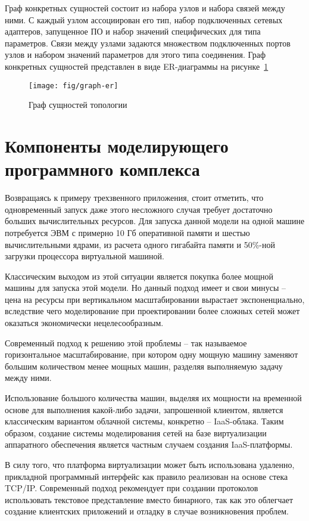 Граф конкретных сущностей состоит из 
набора узлов и набора связей между ними. 
С каждый узлом ассоциирован его тип, набор подключенных сетевых адаптеров, запущенное ПО и 
набор значений специфических для типа параметров. 
Связи между узлами задаются множеством подключенных портов узлов 
и набором значений параметров для этого типа соединения.
Граф конкретных сущностей представлен в виде ER-диаграммы на рисунке~\ref{fig:graph-er}
\begin{figure}
  \centering
  {\texttt{[image: fig/graph-er]}}
  \caption{Граф сущностей топологии}
  \label{fig:graph-er}
\end{figure} 

\section{Компоненты моделирующего программного комплекса}

Возвращаясь к примеру трехзвенного приложения, стоит отметить, что одновременный запуск
даже этого несложного случая требует достаточно больших вычислительных ресурсов.
Для запуска данной модели на одной машине потребуется ЭВМ с примерно 10 Гб оперативной
памяти и шестью вычислительными ядрами, из расчета одного гигабайта памяти и 50\%-ной
загрузки процессора виртуальной машиной.

Классическим выходом из этой ситуации является покупка более мощной машины для запуска
этой модели. Но данный подход имеет и свои минусы -- цена на ресурсы при вертикальном
масштабировании вырастает экспоненциально, вследствие чего моделирование при 
проектировании более сложных сетей может оказаться экономически нецелесообразным.

Современный подход к решению этой проблемы -- так называемое горизонтальное 
масштабирование, при котором одну мощную машину заменяют большим количеством
менее мощных машин, разделяя выполняемую задачу между ними.

Использование большого количества машин, выделяя их мощности на временной основе для
выполнения какой-либо задачи, запрошенной клиентом, является классическим вариантом
облачной системы, конкретно --  IaaS-облака.
Таким образом, создание системы моделирования сетей на базе виртуализации 
аппаратного обеспечения является частным случаем создания IaaS-платформы.

В силу того, что платформа виртуализации может быть использована удаленно, прикладной программный
интерфейс как правило реализован на основе стека TCP/IP. Современный подход рекомендует
при создании протоколов использовать текстовое представление вместо бинарного, так как
это облегчает создание клиентских приложений и отладку в случае возникновения проблем.

